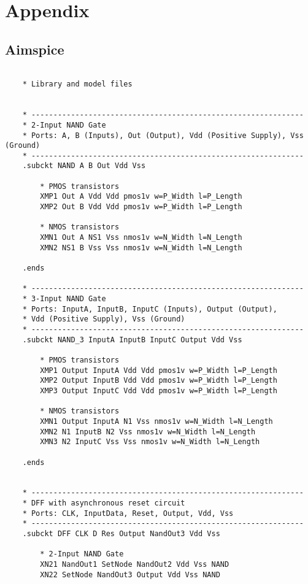 \section{Appendix}
\subsection{Aimspice}
\begin{lstlisting}

    * Library and model files

                  
    * --------------------------------------------------------------
    * 2-Input NAND Gate
    * Ports: A, B (Inputs), Out (Output), Vdd (Positive Supply), Vss (Ground)
    * --------------------------------------------------------------
    .subckt NAND A B Out Vdd Vss
    
        * PMOS transistors
        XMP1 Out A Vdd Vdd pmos1v w=P_Width l=P_Length 
        XMP2 Out B Vdd Vdd pmos1v w=P_Width l=P_Length 
    
        * NMOS transistors
        XMN1 Out A NS1 Vss nmos1v w=N_Width l=N_Length 
        XMN2 NS1 B Vss Vss nmos1v w=N_Width l=N_Length 
    
    .ends
    
    * --------------------------------------------------------------
    * 3-Input NAND Gate
    * Ports: InputA, InputB, InputC (Inputs), Output (Output), 
    * Vdd (Positive Supply), Vss (Ground)
    * --------------------------------------------------------------
    .subckt NAND_3 InputA InputB InputC Output Vdd Vss
    
        * PMOS transistors
        XMP1 Output InputA Vdd Vdd pmos1v w=P_Width l=P_Length 
        XMP2 Output InputB Vdd Vdd pmos1v w=P_Width l=P_Length
        XMP3 Output InputC Vdd Vdd pmos1v w=P_Width l=P_Length
    
        * NMOS transistors
        XMN1 Output InputA N1 Vss nmos1v w=N_Width l=N_Length 
        XMN2 N1 InputB N2 Vss nmos1v w=N_Width l=N_Length
        XMN3 N2 InputC Vss Vss nmos1v w=N_Width l=N_Length  
    
    .ends
    
    
    * --------------------------------------------------------------
    * DFF with asynchronous reset circuit
    * Ports: CLK, InputData, Reset, Output, Vdd, Vss
    * --------------------------------------------------------------
    .subckt DFF CLK D Res Output NandOut3 Vdd Vss
    
        * 2-Input NAND Gate
        XN21 NandOut1 SetNode NandOut2 Vdd Vss NAND
        XN22 SetNode NandOut3 Output Vdd Vss NAND
    

\end{lstlisting}
